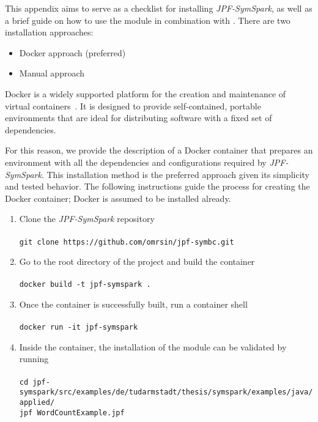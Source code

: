 \label{app:installation}

This appendix aims to serve as a checklist for installing \textit{JPF-SymSpark}, as well as a brief guide on how to use the module in combination with \jpf{}. There are two installation approaches:
\begin{itemize}
	\item Docker approach (preferred)
	\item Manual approach
\end{itemize}


Docker is a widely supported platform for the creation and maintenance of virtual containers~\cite{Merkel2014}. It is designed to provide self-contained, portable environments that are ideal for distributing software with a fixed set of dependencies.

For this reason, we provide the description of a Docker container that prepares an environment with all the dependencies and configurations required by \textit{JPF-SymSpark}. This installation method is the preferred approach given its simplicity and tested behavior. The following instructions guide the process for creating the Docker container; Docker is assumed to be installed  already.

\begin{enumerate}
	\item Clone the \textit{JPF-SymSpark} repository \\ \\	
		\lstinline[]|git clone https://github.com/omrsin/jpf-symbc.git|
	\item Go to the root directory of the project and build the container \\ \\
		\lstinline[]|docker build -t jpf-symspark .|
	\item Once the container is successfully built, run a container shell\\ \\
		\lstinline[]|docker run -it jpf-symspark|
	\item Inside the container, the installation of the module can be validated by running \\ \\
		\lstinline[]|cd jpf-symspark/src/examples/de/tudarmstadt/thesis/symspark/examples/java/applied/| \\
		\lstinline[]|jpf WordCountExample.jpf|
\end{enumerate}

